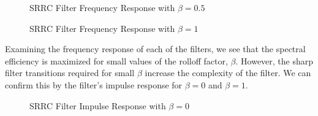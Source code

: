 \documentclass{article}
\begin{document}
\begin{figure}[H]
	\centerline{}
	\caption{SRRC Filter Frequency Response with $\beta=0.5$}
	\label{fig::srrc_freq_response_beta_0_5}
\end{figure}

\begin{figure}[H]
	\centerline{}
	\caption{SRRC Filter Frequency Response with $\beta=1$}
	\label{fig::srrc_freq_response_beta_1}
\end{figure}

\noindent Examining the frequency response of each of the filters, we see that the spectral efficiency is maximized for small values of the rolloff factor, $\beta$. However, the sharp filter transitions required for small $\beta$ increase the complexity of the filter. We can confirm this by the filter's impulse response for $\beta=0$ and $\beta=1$.

\begin{figure}[H]
	\centerline{}
	\caption{SRRC Filter Impulse Response with $\beta=0$}
	\label{fig::srrc_impulse_response_beta_0}
\end{figure}
\end{document}
